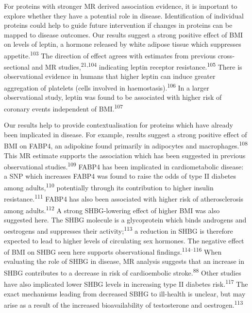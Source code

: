 \documentclass[11pt,twoside]{bristolthesis}
\begin{document}
For proteins with stronger MR derived association evidence, it is important to explore whether they have a potential role in disease. Identification of individual proteins could help to guide future intervention if changes in proteins can be mapped to disease outcomes. Our results suggest a strong positive effect of BMI on levels of leptin, a hormone released by white adipose tissue which suppresses appetite.\textsuperscript{103} The direction of effect agrees with estimates from previous cross-sectional and MR studies,\textsuperscript{21,104} indicating leptin receptor resistance.\textsuperscript{105} There is observational evidence in humans that higher leptin can induce greater aggregation of platelets (cells involved in haemostasis).\textsuperscript{106} In a larger observational study, leptin was found to be associated with higher risk of coronary events independent of BMI.\textsuperscript{107}

Our results help to provide contextualisation for proteins which have already been implicated in disease. For example, results suggest a strong positive effect of BMI on FABP4, an adipokine found primarily in adipocytes and macrophages.\textsuperscript{108} This MR estimate supports the association which has been suggested in previous observational studies.\textsuperscript{109} FABP4 has been implicated in cardiometabolic disease: a SNP which increases FABP4 was found to raise the odds of type II diabetes among adults,\textsuperscript{110} potentially through its contribution to higher insulin resistance.\textsuperscript{111} FABP4 has also been associated with higher risk of atherosclerosis among adults.\textsuperscript{112} A strong SHBG-lowering effect of higher BMI was also suggested here. The SHBG molecule is a glycoprotein which binds androgens and oestrogens and suppresses their activity;\textsuperscript{113} a reduction in SHBG is therefore expected to lead to higher levels of circulating sex hormones. The negative effect of BMI on SHBG seen here supports observational findings.\textsuperscript{114--116} When evaluating the role of SHBG in disease, MR analysis suggests that an increase in SHBG contributes to a decrease in risk of cardioembolic stroke.\textsuperscript{88} Other studies have also implicated lower SHBG levels in increasing type II diabetes risk.\textsuperscript{117} The exact mechanisms leading from decreased SBHG to ill-health is unclear, but may arise as a result of the increased bioavailability of testosterone and oestrogen.\textsuperscript{113}
\end{document}

